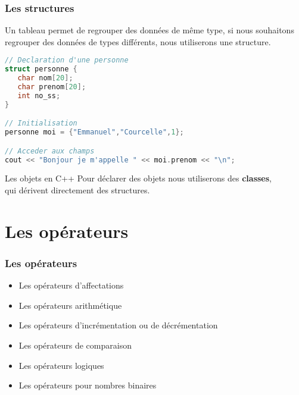 \documentclass{beamer}
\begin{document}
\begin{frame}[fragile=singleslide,shrink=20]
\frametitle{Les structures}
Un tableau permet de regrouper des données de même type, si nous souhaitons regrouper des données de types différents, nous utiliserons une structure.
\begin{lstlisting}[language=c++]
// Declaration d'une personne
struct personne {
   char nom[20];
   char prenom[20];
   int no_ss;
}

// Initialisation
personne moi = {"Emmanuel","Courcelle",1};

// Acceder aux champs
cout << "Bonjour je m'appelle " << moi.prenom << "\n";
\end{lstlisting}

\begin{block}{Les objets en C++}
Pour déclarer des objets nous utiliserons des \textbf{classes}, \\ qui dérivent directement des structures.
\end{block}
\end{frame}

\section{Les opérateurs}

\begin{frame}[fragile=singleslide,shrink=20]
\frametitle{Les opérateurs}

\begin{itemize}
\item{Les opérateurs d'affectations}
\item{Les opérateurs arithmétique}
\item{Les opérateurs d'incrémentation ou de décrémentation}
\item{Les opérateurs de comparaison}
\item{Les opérateurs logiques}
\item{Les opérateurs pour nombres binaires}
\end{itemize}


\end{frame}
\end{document}
